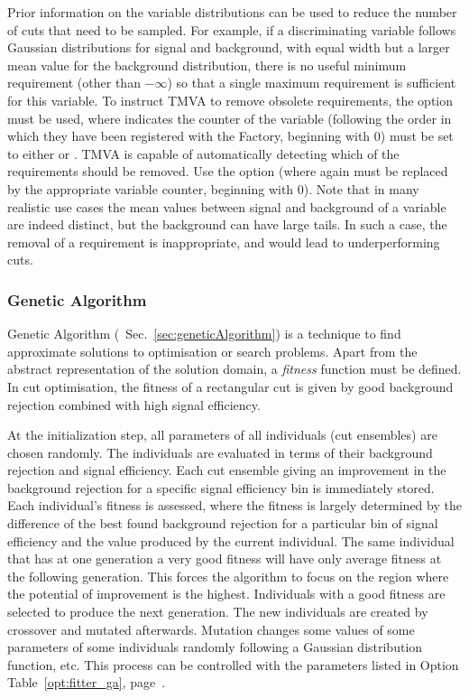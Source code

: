 Prior information on the variable distributions can be used to reduce the 
number of cuts that need to be sampled. For example, if a discriminating variable 
follows Gaussian distributions for signal and background, with equal width but 
a larger mean value for the background distribution, there is no useful minimum
requirement (other than $-\infty$) so that a single maximum requirement is 
sufficient for this variable. To instruct TMVA to remove obsolete requirements,
the option  must be used, where \code{[i]} indicates the counter 
of the variable (following the order in which they have been registered with the 
Factory, beginning with 0) must be set to either  or .
TMVA is capable of automatically detecting which of the requirements should be 
removed. Use the option  (where again \code{[i]} must
be replaced by the appropriate variable counter, beginning with 0). Note that in 
many realistic use cases the mean values between signal and background of a 
variable are indeed distinct, but the background can have large tails. In such a 
case, the removal of a requirement is inappropriate, and would lead to 
underperforming cuts.

\subsubsection*{Genetic Algorithm}

Genetic Algorithm (\cf\  Sec.~\ref{sec:geneticAlgorithm}) is a technique to 
find approximate solutions to optimisation or search problems. Apart from the 
abstract representation of the solution domain, 
a {\em fitness} 
function must be defined. In cut optimisation, the fitness of a rectangular cut 
is given by good background rejection combined with high signal efficiency. 

At the initialization step, all parameters of all individuals (cut ensembles) 
are chosen randomly. The individuals are evaluated in terms of their background 
rejection and signal efficiency. Each cut ensemble giving an improvement 
in the background rejection for a specific signal efficiency bin is immediately 
stored. Each individual's fitness is assessed, where the fitness is 
largely determined by the difference of the best found background rejection 
for a particular bin of signal efficiency and the value produced by the 
current individual. The same individual that has at one generation a very 
good fitness will have only average fitness at the following generation. This 
forces the algorithm to focus on the region where the potential of improvement 
is the highest. 
Individuals with a good fitness are selected to produce the next generation. 
The new individuals are created by crossover and mutated afterwards. Mutation 
changes some values of some parameters of some individuals randomly following
a Gaussian distribution function, etc. This process can be controlled with the 
parameters listed in Option Table~\ref{opt:fitter_ga}, page~\pageref{opt:fitter_ga}.

